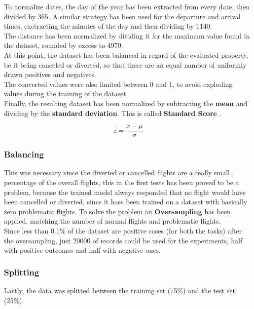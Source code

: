 \documentclass[
	letterpaper, %
	10pt, %
]{class}
\begin{document}
To normalize dates, the day of the year has been extracted from every date, then divided by 365. A similar strategy has been used for the departure and arrival times, exctracting the minutes of the day and then dividing by 1140.\\

The distance has been normalized by dividing it for the maximum value found in the dataset, rounded by excess to 4970.\\

At this point, the dataset has been balanced in regard of the evaluated property, be it being canceled or diverted, so that there are an equal number of uniformly drawn positives and negatives.\\

The converted values were also limited between 0 and 1, to avoid exploding values during the training of the dataset.\\

Finally, the resulting dataset has been normalized by subtracting the \textbf{mean} and dividing by the \textbf{standard deviation}. This is called \textbf{Standard Score} \cite{normalization}.

$$ z = \frac{x - \mu}{\sigma} $$

\subsubsection{Balancing}

This was necessary since the diverted or cancelled flights are a really small percentage of the overall flights,
this in the first tests has been proved to be a problem, because the trained model always responded that no flight would have been cancelled or diverted, since it hass been trained on a dataset with basically zero problematic flights.
To solve the problem an \textbf{Oversampling} has been applied, matching the number of normal flights and problematic flights.\\
Since less than 0.1\% of the dataset are positive cases (for both the tasks) after the oversampling, just 20000 of records could be used for the experiments, half with positive outcomes and half with negative ones.

\subsubsection{Splitting}
Lastly, the data was splitted between the training set (75\%) and the test set (25\%).\\
\end{document}
